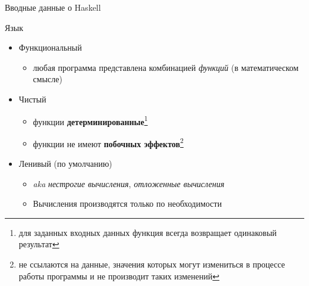 \documentclass{beamer}
\begin{document}
  \begin{frame}{Вводные данные о Haskell}
      
      \begin{block}{Язык}
          \begin{itemize}
              \item Функциональный
                \begin{itemize}
                    \item любая программа представлена комбинацией \textit{функций} (в математическом смысле)
                \end{itemize}
              \item Чистый
                \begin{itemize}
                    \item функции \textbf{детерминированные}\footnote{для заданных входных данных функция всегда возвращает одинаковый результат}
                    \item функции не имеют \textbf{побочных эффектов}\footnote{не ссылаются на данные, значения которых могут измениться в процессе работы программы и не производит таких изменений}
                \end{itemize}
              \item Ленивый (по умолчанию)
                \begin{itemize}
                    \item \textit{aka} \textit{нестрогие вычисления}, \textit{отложенные вычисления}
                    \item Вычисления производятся только по необходимости
                \end{itemize}
          \end{itemize}
      \end{block}
  \end{frame}
\end{document}
